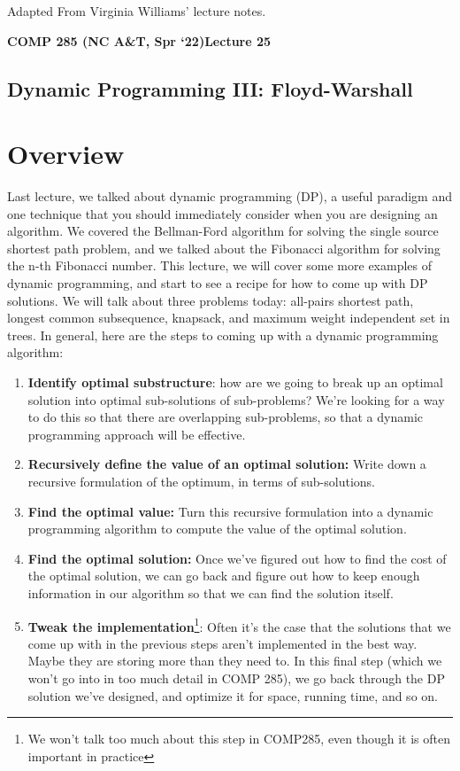 \documentclass [12pt]{article}
\theoremstyle{definition}
\begin{document}
 

\vspace {1em} 
\begin {Instruction} 
Adapted From Virginia Williams' lecture notes.
\end {Instruction}  

{\LARGE \textbf {COMP 285 (NC A\&T, Spr `22)}\hfill \textbf {Lecture 25} } 

\begin{centering}
\section*{Dynamic Programming III: Floyd-Warshall}
\end{centering}

\section{Overview}

Last lecture, we talked about dynamic programming (DP), a useful paradigm and one technique that you should immediately consider when you are designing an algorithm. We covered the Bellman-Ford algorithm for solving the single source shortest path problem, and we talked about the Fibonacci algorithm for solving the n-th Fibonacci number. This lecture, we will cover some more examples of dynamic programming, and start to see a recipe for how to come up with DP solutions. We will talk about three problems today: all-pairs shortest path, longest common subsequence, knapsack, and maximum weight independent set in trees. In general, here are the steps to coming up with a dynamic programming algorithm:

\begin{enumerate}
  \item \textbf{Identify optimal substructure}: how are we going to break up an optimal solution into optimal sub-solutions of sub-problems? We're looking for a way to do this so that there are overlapping sub-problems, so that a dynamic programming approach will be effective.
  \item \textbf{Recursively define the value of an optimal solution:} Write down a recursive formulation of the optimum, in terms of sub-solutions.
  \item \textbf{Find the optimal value:} Turn this recursive formulation into a dynamic programming algorithm to compute the value of the optimal solution.
  \item \textbf{Find the optimal solution:} Once we've figured out how to find the cost of the optimal solution, we can go back and figure out how to keep enough information in our algorithm so that we can find the solution itself.
  \item \textbf{Tweak the implementation}\footnote{We won't talk too much about this step in COMP285, even though it is often important in practice}: Often it's the case that the solutions that we come up with in the previous steps aren't implemented in the best way. Maybe they are storing more than they need to. In this final step (which we won't go into in too much detail in COMP 285), we go back through the DP solution we've designed, and optimize it for space, running time, and so on.
\end{enumerate}
\end{document}
